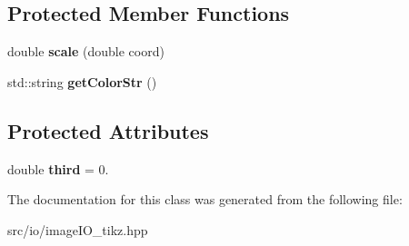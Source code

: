 \subsection*{Protected Member Functions}
\begin{DoxyCompactItemize}
\item 
\hypertarget{classutk_1_1PointsetIllustrator__TIKZ_a5d873daa100e1bf2ec9c4b7a39904409}{double {\bfseries scale} (double coord)}\label{classutk_1_1PointsetIllustrator__TIKZ_a5d873daa100e1bf2ec9c4b7a39904409}

\item 
\hypertarget{classutk_1_1PointsetIllustrator__TIKZ_a88c91614daeb68c6db98b796e14bc598}{std\-::string {\bfseries get\-Color\-Str} ()}\label{classutk_1_1PointsetIllustrator__TIKZ_a88c91614daeb68c6db98b796e14bc598}

\end{DoxyCompactItemize}
\subsection*{Protected Attributes}
\begin{DoxyCompactItemize}
\item 
\hypertarget{classutk_1_1PointsetIllustrator__TIKZ_a3404dbaa05e58ba6cae89a63d85018a2}{double {\bfseries third} = 0.}\label{classutk_1_1PointsetIllustrator__TIKZ_a3404dbaa05e58ba6cae89a63d85018a2}

\end{DoxyCompactItemize}


The documentation for this class was generated from the following file\-:\begin{DoxyCompactItemize}
\item 
src/io/image\-I\-O\-\_\-tikz.\-hpp\end{DoxyCompactItemize}
